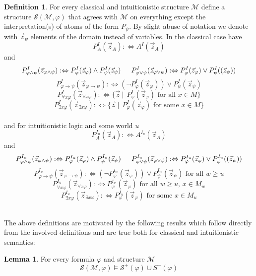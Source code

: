 \documentclass[a4paper,12pt]{report}
\theoremstyle{definition}
\theoremstyle{definition}
\theoremstyle{definition}
\newtheorem{lemma}[theorem]{Lemma}
\theoremstyle{definition}
\theoremstyle{definition}
\newtheorem{definition}[theorem]{Definition}
\theoremstyle{definition}
\theoremstyle{definition}
\begin{document}
	\begin{definition}
		For every classical and intuitionistic structure $\mathcal M$ define a structure $\mathcal S(\mathcal M,\varphi)$ that agrees with $\mathcal M$ on everything except the interpretation(s) of atoms of the form $P_\psi$. By slight abuse of notation we denote with $\vec z_\psi$ elements of the domain instead of variables. In the classical case have
		$$P_A^I(\vec z_A):\Leftrightarrow A^I(\vec z_A)$$
		and
		$$P_{\varphi\wedge\psi}^I(\vec z_{\varphi\wedge\psi}) :\Leftrightarrow P_{\varphi}^I(\vec z_\varphi)\wedge P_{\psi}^I(\vec z_\psi)\indent P_{\varphi\vee\psi}^I(\vec z_{\varphi\vee\psi}) :\Leftrightarrow P_{\varphi}^I(\vec z_\varphi)\vee P_{\psi}^I((\vec z_\psi))$$$$ P_{\varphi\to\psi}^I(\vec z_{\varphi\to\psi}) :\Leftrightarrow (\neg P_{\varphi}^I(\vec z_{\varphi}))\vee P_{\psi}^I(\vec z_{\psi})$$
		$$P_{\forall x\varphi}^I(\vec z_{\forall x\varphi}) :\Leftrightarrow \{\vec z\:|\:\:P_{\varphi}^I(\vec z_\varphi) \text{ for all $x\in M$}\}$$$$ P_{\exists x\varphi}^I(\vec z_{\exists x\varphi}) :\Leftrightarrow \{\vec z\:|\:\:P_{\varphi}^I(\vec z_\varphi) \text{ for some $x\in M$}\}$$
		\\
		and for intuitionistic logic and some world $u$
		$$P_A^{I_u}(\vec z_A):\Leftrightarrow A^{I_u}(\vec z_A)$$
		and
		$$P_{\varphi\wedge\psi}^{I_u}(\vec z_{\varphi\wedge\psi}) :\Leftrightarrow P_{\varphi}^{I_u}(\vec z_\varphi)\wedge P_{\psi}^{I_u}(\vec z_\psi)\indent P_{\varphi\vee\psi}^{I_u}(\vec z_{\varphi\vee\psi}) :\Leftrightarrow P_{\varphi}^{I_u}(\vec z_\varphi)\vee P_{\psi}^{I_u}((\vec z_\psi))$$$$ P_{\varphi\to\psi}^{I_u}(\vec z_{\varphi\to\psi}) :\Leftrightarrow(\neg P_{\varphi}^{I_w}(\vec z_{\varphi}))\vee P_{\psi}^{I_w}(\vec z_{\psi})\text{ for all $w\geq u$}$$
		$$P_{\forall x\varphi}^{I_u}(\vec z_{\forall x\varphi}) :\Leftrightarrow P_{\varphi}^{I_w}(\vec z_\varphi) \text{ for all $w\geq u$, $x\in M_w$}$$$$ P_{\exists x\varphi}^{I_u}(\vec z_{\exists x\varphi}) :\Leftrightarrow P_{\varphi}^{I_u}(\vec z_\varphi) \text{ for some $x\in M_u$}$$
		\\
	\end{definition}
	
	The above definitions are motivated by the following results which follow directly from the involved definitions and are true both for classical and intuitionistic semantics:
	
	\begin{lemma}
		For every formula $\varphi$ and structure $\mathcal M$
		$$\mathcal S(\mathcal M, \varphi)\models\mathcal S^+(\varphi)\cup S^-(\varphi)$$
	\end{lemma}
	
\end{document}
